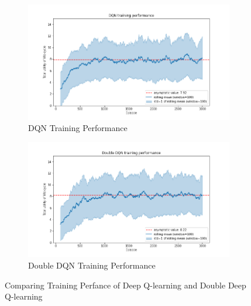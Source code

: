 \begin{figure}[ht]
\begin{subfigure}{.5\textwidth}
  \centering
  \includegraphics[width=1\linewidth]{figures/dqn_training_performance_simple_model.png}
  \caption{DQN Training Performance}
  \label{fig:dqn_training_performance_simple}
\end{subfigure}%
\begin{subfigure}{.5\textwidth}
  \centering
  \includegraphics[width=1\linewidth]{figures/ddqn_training_performance_simple_model.png}
  \caption{Double DQN Training Performance}
  \label{fig:ddqn_training_performance_simple}
\end{subfigure}
    \caption{Comparing Training Perfance of Deep Q-learning and Double Deep Q-learning}
    \label{fig:training_performance_simple_model}
\end{figure}

